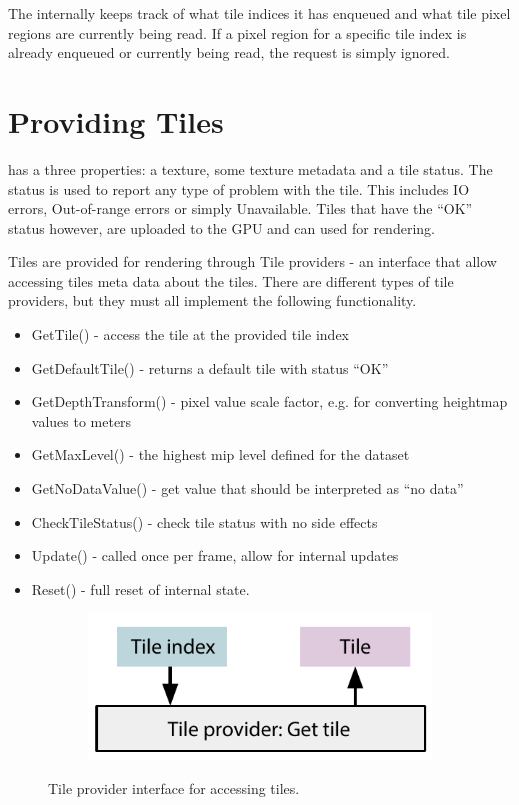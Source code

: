 The  internally keeps track of what tile indices it has enqueued and what tile pixel regions are currently being read. If a pixel region for a specific tile index is already enqueued or currently being read, the request is simply ignored. 


\section{Providing Tiles}
 has a three properties: a texture, some texture metadata and a tile status. The status is used to report any type of problem with the tile. This includes IO errors, Out-of-range errors or simply Unavailable. Tiles that have the ``OK'' status however, are uploaded to the GPU and can used for rendering. 

Tiles are provided for rendering through Tile providers - an interface that allow accessing tiles meta data about the tiles. There are different types of tile providers, but they must all implement the following functionality.


\begin{itemize}
\item GetTile() - access the tile at the provided tile index
\item GetDefaultTile() - returns a default tile with status ``OK''
\item GetDepthTransform() - pixel value scale factor, e.g. for converting heightmap values to meters
\item GetMaxLevel() - the highest mip level defined for the dataset
\item GetNoDataValue() - get value that should be interpreted as ``no data''
\item CheckTileStatus() - check tile status with no side effects
\item Update() - called once per frame, allow for internal updates
\item Reset() - full reset of internal state. 
\end{itemize}

\begin{figure}[htbp]
    \centering
    \begin{subfigure}[bt]{0.4\textwidth}
        \includegraphics[width=\textwidth]{figures/implementation/tileprovider/tileprovider_gettile.pdf}
    \end{subfigure}
    \caption{Tile provider interface for accessing tiles.}
    \label{fig:tileprovider}
\end{figure}


